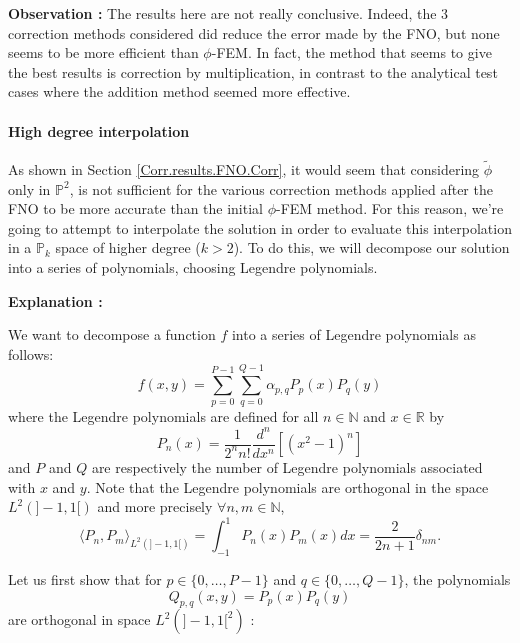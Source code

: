 \textbf{Observation :} The results here are not really conclusive. Indeed, the 3 correction methods considered did reduce the error made by the FNO, but none seems to be more efficient than $\phi$-FEM. In fact, the method that seems to give the best results is correction by multiplication, in contrast to the analytical test cases where the addition method seemed more effective.

\paragraph{High degree interpolation} \label{Corr.results.FNO.Legendre}

As shown in Section \ref{Corr.results.FNO.Corr}, it would seem that considering $\tilde{\phi}$ only in $\mathbb{P}^2$, is not sufficient for the various correction methods applied after the FNO to be more accurate than the initial $\phi$-FEM method. For this reason, we're going to attempt to interpolate the solution in order to evaluate this interpolation in a $\mathbb{P}_k$ space of higher degree ($k>2$). To do this, we will decompose our solution into a series of polynomials, choosing Legendre polynomials.

\textbf{Explanation :}

We want to decompose a function $f$ into a series of Legendre polynomials as follows:
\begin{equation*}
	f(x,y)=\sum_{p=0}^{P-1}\sum_{q=0}^{Q-1}\alpha_{p,q}P_p(x)P_q(y)
	\label{decomp}
\end{equation*}
where the Legendre polynomials are defined for all $n\in\mathbb{N}$ and $x\in\mathbb{R}$ by
\begin{equation*}
	P_n(x)=\frac{1}{2^n n!}\frac{d^n}{dx^n}[(x^2-1)^n]
\end{equation*}
and $P$ and $Q$ are respectively the number of Legendre polynomials associated with $x$ and $y$.
Note that the Legendre polynomials are orthogonal in the space $L^2(]-1,1[)$ and more precisely $\forall n,m\in\mathbb{N}$,
\begin{equation*}
	\langle P_n,P_m\rangle_{L^2(]-1,1[)}=\int_{-1}^1 P_n(x)P_m(x)dx=\frac{2}{2n+1}\delta_{nm}.
	\label{ortho}
\end{equation*}

Let us first show that for $p\in\{0,\dots,P-1\}$ and $q\in\{0,\dots,Q-1\}$, the polynomials
\begin{equation*}
	Q_{p,q}(x,y)=P_p(x)P_q(y)
\end{equation*}
are orthogonal in space $L^2(]-1,1[^2)$ :

